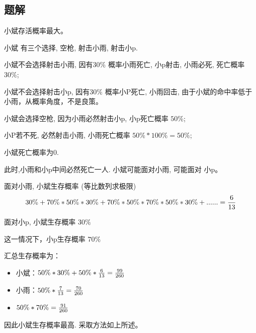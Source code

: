 \subsection{题解}
\begin{frame}
小斌存活概率最大。

小斌 有三个选择, 空枪, 射击小雨, 射击小p.

小斌不会选择射击小雨, 因有$30\%$ 概率小雨死亡, 小p射击, 小雨必死, 死亡概率 $30\%$;

小斌不会选择射击小p, 因有$30\%$ 概率小P死亡, 小雨回击, 由于小斌的命中率低于小雨，从概率角度，不是良策。

小斌会选择空枪, 因为小雨必然射击小p, 小p死亡概率 $50\%$;

小P若不死, 必然射击小雨, 小雨死亡概率 $50\% *100\% = 50\%$;

小斌死亡概率为0.
\end{frame}

\begin{frame}
此时,小雨和小p中间必然死亡一人.  小斌可能面对小雨, 可能面对 小p。

面对小雨, 小斌生存概率 (等比数列求极限)
$$30\% + 70\%*50\%*30\% + 70\%*50\%*70\%*50\%*30\% +...... = {6 \over 13}$$

面对小p,  小斌生存概率 $30\%$

这一情况下，小p生存概率 $70\%$
\end{frame}

\begin{frame}
汇总生存概率为：

\begin{itemize}
    \item 小斌：${50\%}*30\% +50\%*{6\over13} = {99\over 260}$
    \item 小雨：$50\%* {7\over13}= {70\over260}$
    \item  $50\%*70\%={91\over 260}$
\end{itemize}

因此小斌生存概率最高. 采取方法如上所述。
\end{frame}

